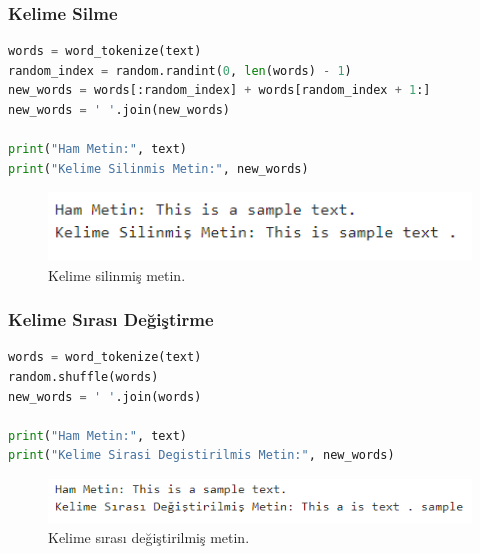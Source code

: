 \subsubsection{Kelime Silme}

\begin{lstlisting}[language=Python]
words = word_tokenize(text)
random_index = random.randint(0, len(words) - 1)
new_words = words[:random_index] + words[random_index + 1:]
new_words = ' '.join(new_words)

print("Ham Metin:", text)
print("Kelime Silinmis Metin:", new_words)
\end{lstlisting}

\begin{figure}[h]
    \centering
    \includegraphics[width=1\textwidth]{images/text_aug_03.png}
    \caption{Kelime silinmiş metin.}
    \label{fig:enter-label}
\end{figure}

\newpage

\subsubsection{Kelime Sırası Değiştirme}

\begin{lstlisting}[language=Python]
words = word_tokenize(text)
random.shuffle(words)
new_words = ' '.join(words)

print("Ham Metin:", text)
print("Kelime Sirasi Degistirilmis Metin:", new_words)
\end{lstlisting}

\begin{figure}[h]
    \centering
    \includegraphics[width=1\textwidth]{images/text_aug_04.png}
    \caption{Kelime sırası değiştirilmiş metin.}
    \label{fig:enter-label}
\end{figure}

\newpage